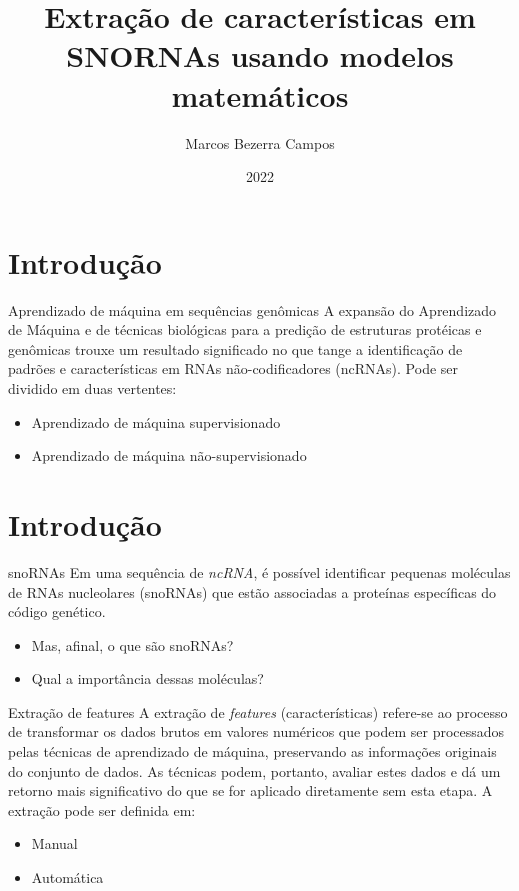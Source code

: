 \documentclass{apresentacao-ifb}
\author{Marcos Bezerra Campos}
\title{Extração de características em SNORNAs usando modelos matemáticos}
\subtitle{}
\institute{Instituto Federal de Brasília, Campus Taguatinga}
\date{2022}
\begin{document}
\maketitle



\section{Introdução}

\begin{frame}{Aprendizado de máquina em sequências genômicas}
    A expansão do Aprendizado de Máquina e de técnicas biológicas para a predição de
estruturas protéicas e genômicas trouxe um resultado significado no que tange a identificação de padrões e características em RNAs não-codificadores (ncRNAs). Pode ser dividido em duas vertentes:

    \begin{itemize}
        \item Aprendizado de máquina supervisionado
        \item Aprendizado de máquina não-supervisionado
    \end{itemize}
\end{frame}

\section{Introdução}

\begin{frame}{snoRNAs}
	Em uma sequência de \textit{ncRNA}, é possível identificar pequenas moléculas de RNAs nucleolares (snoRNAs) que estão associadas a proteínas específicas do código genético.
        
        \begin{itemize}
            \item Mas, afinal, o que são snoRNAs?
            \item Qual a importância dessas moléculas?
        \end{itemize}
\end{frame}

\begin{frame}{Extração de features}
	A extração de \textit{features} (características)  refere-se ao processo de transformar os dados brutos em valores numéricos que podem ser processados pelas técnicas de aprendizado de máquina, preservando as informações originais do conjunto de dados. As técnicas podem, portanto, avaliar estes dados e dá um retorno mais significativo do que se for aplicado diretamente sem esta etapa. A extração pode ser definida em:
        
        \begin{itemize}
            \item Manual
            \item Automática
        \end{itemize}
\end{frame}
\end{document}
